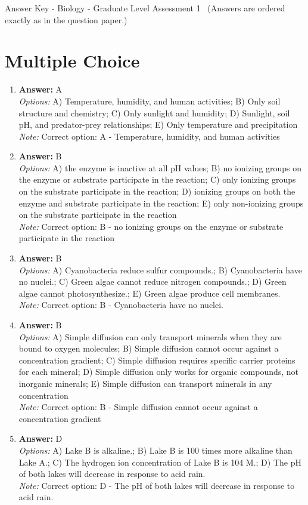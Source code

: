 \documentclass[12pt]{article}
\begin{document}
\begin{center}
Answer Key - Biology - Graduate Level Assessment 1 \
\small (Answers are ordered exactly as in the question paper.)
\end{center}

\section*{Multiple Choice}
\begin{enumerate}[label=\arabic*.]
\item \textbf{Answer:} A
\\ \textit{Options:} A) Temperature, humidity, and human activities; B) Only soil structure and chemistry; C) Only sunlight and humidity; D) Sunlight, soil pH, and predator-prey relationships; E) Only temperature and precipitation
\\ \textit{Note:} Correct option: A - Temperature, humidity, and human activities
\item \textbf{Answer:} B
\\ \textit{Options:} A) the enzyme is inactive at all pH values; B) no ionizing groups on the enzyme or substrate participate in the reaction; C) only ionizing groups on the substrate participate in the reaction; D) ionizing groups on both the enzyme and substrate participate in the reaction; E) only non-ionizing groups on the substrate participate in the reaction
\\ \textit{Note:} Correct option: B - no ionizing groups on the enzyme or substrate participate in the reaction
\item \textbf{Answer:} B
\\ \textit{Options:} A) Cyanobacteria reduce sulfur compounds.; B) Cyanobacteria have no nuclei.; C) Green algae cannot reduce nitrogen compounds.; D) Green algae cannot photosynthesize.; E) Green algae produce cell membranes.
\\ \textit{Note:} Correct option: B - Cyanobacteria have no nuclei.
\item \textbf{Answer:} B
\\ \textit{Options:} A) Simple diffusion can only transport minerals when they are bound to oxygen molecules; B) Simple diffusion cannot occur against a concentration gradient; C) Simple diffusion requires specific carrier proteins for each mineral; D) Simple diffusion only works for organic compounds, not inorganic minerals; E) Simple diffusion can transport minerals in any concentration
\\ \textit{Note:} Correct option: B - Simple diffusion cannot occur against a concentration gradient
\item \textbf{Answer:} D
\\ \textit{Options:} A) Lake B is alkaline.; B) Lake B is 100 times more alkaline than Lake A.; C) The hydrogen ion concentration of Lake B is 104 M.; D) The pH of both lakes will decrease in response to acid rain.
\\ \textit{Note:} Correct option: D - The pH of both lakes will decrease in response to acid rain.
\end{enumerate}
\end{document}
